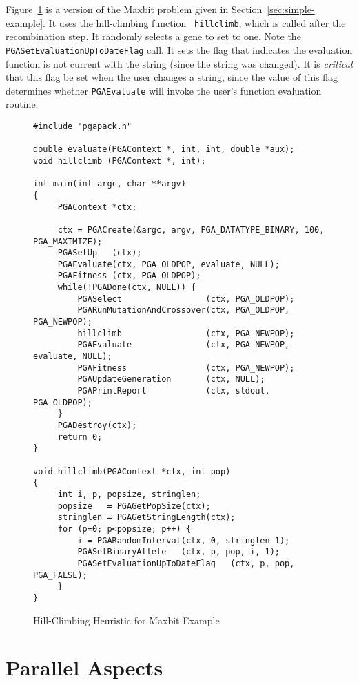 \documentclass{report}
\begin{document}
Figure~\ref{example:hill} is a version of the Maxbit problem given in
Section~\ref{sec:simple-example}.  It uses the hill-climbing function {\tt
hillclimb}, which is called after the recombination step.  It randomly selects
a gene to set to one.  Note the {\tt PGASetEvaluationUpToDateFlag} call.  It
sets the flag that indicates the evaluation function is not current with the
string (since the string was changed).  It is {\em critical} that this flag be
set when the user changes a string, since the value of this flag
determines whether {\tt PGAEvaluate} will invoke the user's function
evaluation routine.

\begin{figure}[th]
\begin{verbatim}
#include "pgapack.h"

double evaluate(PGAContext *, int, int, double *aux);
void hillclimb (PGAContext *, int);

int main(int argc, char **argv)
{
     PGAContext *ctx;

     ctx = PGACreate(&argc, argv, PGA_DATATYPE_BINARY, 100, PGA_MAXIMIZE);
     PGASetUp   (ctx);
     PGAEvaluate(ctx, PGA_OLDPOP, evaluate, NULL);  
     PGAFitness (ctx, PGA_OLDPOP);
     while(!PGADone(ctx, NULL)) {
         PGASelect                 (ctx, PGA_OLDPOP);
         PGARunMutationAndCrossover(ctx, PGA_OLDPOP, PGA_NEWPOP);
         hillclimb                 (ctx, PGA_NEWPOP);
         PGAEvaluate               (ctx, PGA_NEWPOP, evaluate, NULL);
         PGAFitness                (ctx, PGA_NEWPOP);
         PGAUpdateGeneration       (ctx, NULL);
         PGAPrintReport            (ctx, stdout, PGA_OLDPOP);
     }
     PGADestroy(ctx);
     return 0;
}

void hillclimb(PGAContext *ctx, int pop)
{
     int i, p, popsize, stringlen;
     popsize   = PGAGetPopSize(ctx);
     stringlen = PGAGetStringLength(ctx);
     for (p=0; p<popsize; p++) {
         i = PGARandomInterval(ctx, 0, stringlen-1);
         PGASetBinaryAllele   (ctx, p, pop, i, 1);
         PGASetEvaluationUpToDateFlag   (ctx, p, pop, PGA_FALSE);
     }
}
\end{verbatim}
\caption{Hill-Climbing Heuristic for Maxbit Example}\label{example:hill}
\end{figure}

\chapter{Parallel Aspects}\label{chp:parallel}
\end{document}
